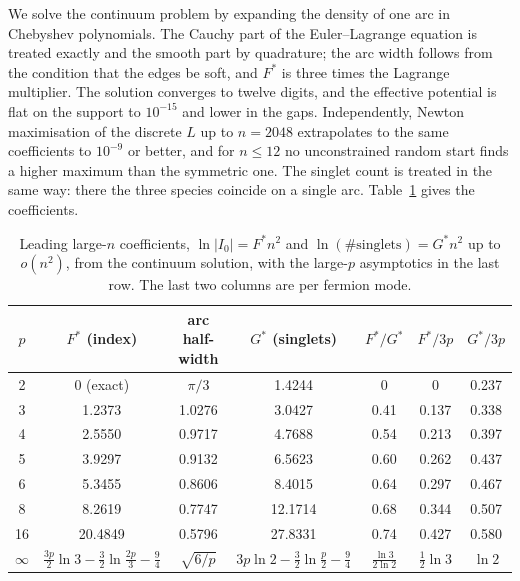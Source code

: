 \documentclass[10pt]{article}
\begin{document}
We solve the continuum problem by expanding the density of one arc in Chebyshev polynomials. The Cauchy part of the
Euler--Lagrange equation is treated exactly and the smooth part by quadrature; the arc width follows from the
condition that the edges be soft, and $F^*$ is three times the Lagrange multiplier. The solution converges to twelve
digits, and the effective potential is flat on the support to $10^{-15}$ and lower in the gaps. Independently, Newton
maximisation of the discrete $L$ up to $n=2048$ extrapolates to the same coefficients to $10^{-9}$ or better, and for
$n\le12$ no unconstrained random start finds a higher maximum than the symmetric one. The singlet count is treated in
the same way: there the three species coincide on a single arc. Table~\ref{tab:saddle} gives the coefficients.

\begin{table}[t]\centering\small
\begin{tabular}{ccccccc}
\toprule
$p$ & $F^*$ (index) & arc half-width & $G^*$ (singlets) & $F^*/G^*$ & $F^*/3p$ & $G^*/3p$\\
\midrule
2 & 0 (exact) & $\pi/3$ & 1.4244 & 0 & 0 & 0.237\\
3 & 1.2373 & 1.0276 & 3.0427 & 0.41 & 0.137 & 0.338\\
4 & 2.5550 & 0.9717 & 4.7688 & 0.54 & 0.213 & 0.397\\
5 & 3.9297 & 0.9132 & 6.5623 & 0.60 & 0.262 & 0.437\\
6 & 5.3455 & 0.8606 & 8.4015 & 0.64 & 0.297 & 0.467\\
8 & 8.2619 & 0.7747 & 12.1714 & 0.68 & 0.344 & 0.507\\
16 & 20.4849 & 0.5796 & 27.8331 & 0.74 & 0.427 & 0.580\\
$\infty$ & $\frac{3p}2\ln3-\frac32\ln\frac{2p}3-\frac94$ & $\sqrt{6/p}$ & $3p\ln2-\frac32\ln\frac p2-\frac94$ &
$\frac{\ln3}{2\ln2}$ & $\frac12\ln3$ & $\ln2$\\
\bottomrule
\end{tabular}
\caption{Leading large-$n$ coefficients, $\ln|I_0|=F^*n^2$ and $\ln(\#\text{singlets})=G^*n^2$ up to $o(n^2)$, from
the continuum solution, with the large-$p$ asymptotics in the last row. The last two columns are per fermion mode.}
\label{tab:saddle}
\end{table}
\end{document}
